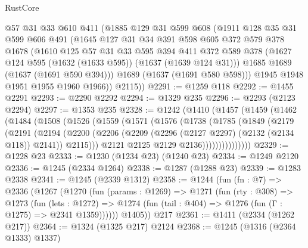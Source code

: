 \begin{lexlean}{RustCore}
\begin{coremodule}
        @57
        @31
        @33
        @610
        @411
        (@1885
          @129
          @31
          @599
          @608
          (@1911
            @128
            @35
            @31
            @599
            @606
            @491
            (@1645
              @127
              @31
              @34
              @391
              @598
              @605
              @372
              @579
              @378
              @1678
              (@1610
                @125
                @57
                @31
                @33
                @595
                @394
                @411
                @372
                @589
                @378
                (@1627 @124 @595 (@1632 (@1633 @595)) (@1637 (@1639 @124 @31)))
                @1685
                @1689
                (@1637 (@1691 @590 @394)))
              @1689
              (@1637 (@1691 @580 @598)))
            @1945
            @1948
            @1951
            @1955
            @1960
            @1966))
        @2115))
@2291 := @1259 @118
@2292 := @1455 @2291
@2293 := @2290 @2292
@2294 := @1329 @235
@2296 := @2293 (@2123 @2294)
@2297 := @1353 @235
@2328 := @1242
    (@1410
      (@1457
        (@1459
          (@1462
            (@1484
              (@1508
                (@1526
                  (@1559
                    (@1571
                      (@1576
                        (@1738
                          (@1785
                            (@1849
                              (@2179
                                (@2191
                                  (@2194
                                    (@2200
                                      (@2206
                                        (@2209 (@2296 (@2127 @2297) (@2132 (@2134 @118)) @2141))
                                        @2115)))
                                  @2121
                                  @2125
                                  @2129
                                  @2136)))))))))))))))
@2329 := @1228 @23
@2333 := @1230 (@1234 @23) (@1240 @23)
@2334 := @1249 @2120
@2336 := @1245 (@2334 @1264)
@2338 := @1287 (@1288 @23)
@2339 := @1283 @2338
@2341 := @1245 (@2339 @1312)
@2358 := @1244
    (fun (fn : @7) =>
    @2336
      (@1267
        (@1270
          (fun (params : @1269) =>
          @1271
            (fun (rty : @308) =>
            @1273
              (fun (lets : @1272) =>
              @1274 (fun (tail : @404) => @1276 (fun (Γ : @1275) => @2341 @1359))))))
        @1405))
    @217
@2361 := @1411 (@2334 (@1262 @217))
@2364 := @1324 (@1325 @217) @2124
@2368 := @1245 (@1316 (@2364 @1333) @1337)

\end{coremodule}
\end{lexlean}
